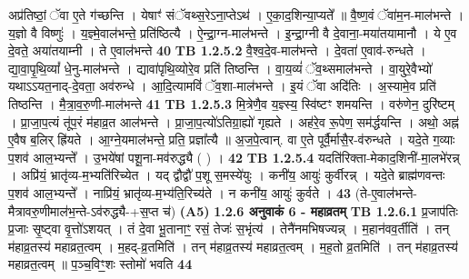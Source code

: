 \documentclass[17pt]{extarticle}
\begin{document}
                  अप्र॑तिष्ठां॒ ॅवा ए॒ते ग॑च्छन्ति । येषाꣳ॑ संॅवथ्स॒रेऽना॒प्तेऽथ॑ । ए॒का॒द॒शिन्या॒प्यते᳚ ॥ वै॒ष्ण॒वं ॅवा॑म॒न-माल॑भन्ते । य॒ज्ञो वै विष्णुः॑ । य॒ज्ञ्मे॒वाल॑भन्ते॒ प्रति॑ष्ठित्यै । ऐ॒न्द्रा॒ग्न-माल॑भन्ते । इ॒न्द्रा॒ग्नी वै दे॒वाना॒-मया॑तयामानौ । ये ए॒व दे॒वते॒ अया॑तयाम्नी । ते ए॒वाल॑भन्ते \textbf{ 40} \newline
                  \newline
                                \textbf{ TB 1.2.5.2} \newline
                  वै॒श्व॒दे॒व-माल॑भन्ते । दे॒वता॑ ए॒वाव॑-रुन्धते । द्या॒वा॒पृ॒थि॒व्यां᳚ धे॒नु-माल॑भन्ते । द्यावा॑पृथि॒व्योरे॒व प्रति॑ तिष्ठन्ति । वा॒य॒व्यं॑ ॅव॒थ्समाल॑भन्ते । वा॒युरे॒वैभ्यो॑ यथाऽऽयत॒नाद्-दे॒वता॒ अव॑रुन्धे । आ॒दि॒त्यामविं॑ ॅव॒शा-माल॑भन्ते । इ॒यं ॅवा अदि॑तिः । अ॒स्यामे॒व प्रति॑ तिष्ठन्ति । मै॒त्रा॒व॒रु॒णी-माल॑भन्ते \textbf{ 41} \newline
                  \newline
                                \textbf{ TB 1.2.5.3} \newline
                  मि॒त्रेणै॒व य॒ज्ञ्स्य॒ स्वि॑ष्टꣳ शमयन्ति । वरु॑णेन॒ दुरि॑ष्टम् । प्रा॒जा॒प॒त्यं तू॑प॒रं म॑हाव्र॒त आल॑भन्ते । प्रा॒जा॒प॒त्यो॑ऽतिग्रा॒ह्यो॑ गृह्यते । अह॑रे॒व रू॒पेण॒ सम॑र्द्धयन्ति । अथो॒ अह्न॑ ए॒वैष ब॒लिर् ह्रि॑यते । आ॒ग्ने॒यमाल॑भन्ते॒ प्रति॒ प्रज्ञा᳚त्यै ॥ अ॒ज॒पे॒त्वान्. वा ए॒ते पूर्वै॒र्मासै॒र-व॑रुन्धते । यदे॒ते ग॒व्याः प॒शव॑ आल॒भ्यन्ते᳚ । उ॒भये॑षां पशू॒ना-मव॑रुद्ध्यै ( ) । \textbf{ 42} \newline
                  \newline
                                \textbf{ TB 1.2.5.4} \newline
                  यदति॑रिक्ता-मेकाद॒शिनी॑-मा॒लभे॑रन्न् । अप्रि॑यं॒ भ्रातृ॑व्य-म॒भ्यति॑रिच्येत । यद् द्वौद्वौ॑ प॒शू स॒मस्ये॑युः । कनी॑य॒ आयुः॑ कुर्वीरन्न् । यदे॒ते ब्राह्म॑णवन्तः प॒शव॑ आल॒भ्यन्ते᳚ । नाप्रि॑यं॒ भ्रातृ॑व्य-म॒भ्य॑ति॒रिच्य॑ते । न कनी॑य॒ आयुः॑ कुर्वते । \textbf{ 43} \newline
                  \newline
                                    (ते-ए॒वाल॑भन्ते-मैत्रावरु॒णीमाल॑भ॒न्ते-ऽव॑रुद्ध्यै-+स॒प्त च॑) \textbf{(A5)} \newline \newline
                \textbf{ 1.2.6      अनुवाकं   6 - महाव्रतम्} \newline
                                \textbf{ TB 1.2.6.1} \newline
                  प्र॒जाप॑तिः प्र॒जाः सृ॒ष्ट्वा वृ॒त्तो॑ऽशयत् । तं दे॒वा भू॒तानाꣳ॒॒ रसं॒ तेजः॑ स॒भृंत्य॑ । तेनै॑नमभिषज्यन्न् । म॒हान॑वव॒र्तीति॑ । तन् म॑हाव्र॒तस्य॑ महाव्रत॒त्वम् । म॒हद्-व्र॒तमिति॑ । तन् म॑हाव्र॒तस्य॑ महाव्रत॒त्वम् । म॒ह॒तो व्र॒तमिति॑ । तन् म॑हाव्र॒तस्य॑ महाव्रत॒त्वम् ॥ प॒ञ्च॒विꣳ॒॒शः स्तोमो॑ भवति \textbf{ 44} \newline
\end{document}
